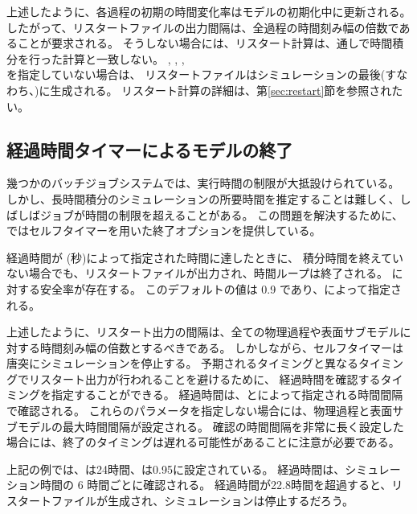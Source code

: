 上述したように、各過程の初期の時間変化率はモデルの初期化中に更新される。
したがって、リスタートファイルの出力間隔は、全過程の時間刻み幅の倍数であることが要求される。
そうしない場合には、リスタート計算は、通しで時間積分を行った計算と一致しない。
, ,  , \\ を指定していない場合は、
リスタートファイルはシミュレーションの最後(すなわち、)に生成される。
リスタート計算の詳細は、第\ref{sec:restart}節を参照されたい。


\subsection{経過時間タイマーによるモデルの終了} \label{subsec:wallclock_check}

幾つかのバッチジョブシステムでは、実行時間の制限が大抵設けられている。
しかし、長時間積分のシミュレーションの所要時間を推定することは難しく、しばしばジョブが時間の制限を超えることがある。
この問題を解決するために、{\scalerm}ではセルフタイマーを用いた終了オプションを提供している。

経過時間が (秒)によって指定された時間に達したときに、
積分時間を終えていない場合でも、リスタートファイルが出力され、時間ループは終了される。
に対する安全率が存在する。
このデフォルトの値は 0.9 であり、によって指定される。 

上述したように、リスタート出力の間隔は、全ての物理過程や表面サブモデルに対する時間刻み幅の倍数とするべきである。
しかしながら、セルフタイマーは唐突にシミュレーションを停止する。
予期されるタイミングと異なるタイミングでリスタート出力が行われることを避けるために、
経過時間を確認するタイミングを指定することができる。
経過時間は、とによって指定される時間間隔で確認される。
これらのパラメータを指定しない場合には、物理過程と表面サブモデルの最大時間間隔が設定される。
確認の時間間隔を非常に長く設定した場合には、終了のタイミングは遅れる可能性があることに注意が必要である。

上記の例では、は24時間、は0.95に設定されている。
経過時間は、シミュレーション時間の 6 時間ごとに確認される。
経過時間が22.8時間を超過すると、リスタートファイルが生成され、シミュレーションは停止するだろう。



